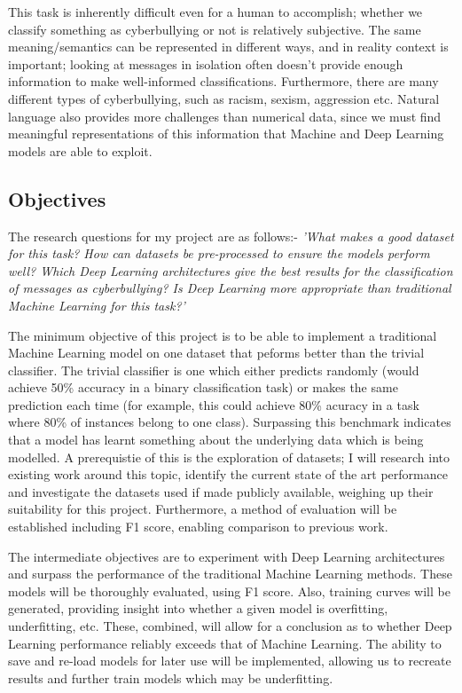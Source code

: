 \documentclass[12pt,a4paper]{article}
\begin{document}
This task is inherently difficult even for a human to accomplish; whether we classify something as cyberbullying or not is relatively subjective. The same meaning/semantics can be represented in different ways, and in reality context is important; looking at messages in isolation often doesn't provide enough information to make well-informed classifications. Furthermore, there are many different types of cyberbullying, such as racism, sexism, aggression etc. Natural language also provides more challenges than numerical data, since we must find meaningful representations of this information that Machine and Deep Learning models are able to exploit.



\subsection{Objectives}
The research questions for my project are as follows:- \newline
\textit{'What makes a good dataset for this task? How can datasets be pre-processed to ensure the models perform well? Which Deep Learning architectures give the best results for the classification of messages as cyberbullying? Is Deep Learning more appropriate than traditional Machine Learning for this task?'} \newline

The minimum objective of this project is to be able to implement a traditional Machine Learning model on one dataset that peforms better than the trivial classifier. The trivial classifier is one which either predicts randomly (would achieve 50\% accuracy in a binary classification task) or makes the same prediction each time (for example, this could achieve 80\% acuracy in a task where 80\% of instances belong to one class). Surpassing this benchmark indicates that a model has learnt something about the underlying data which is being modelled. A prerequistie of this is the exploration of datasets; I will research into existing work around this topic, identify the current state of the art performance and investigate the datasets used if made publicly available, weighing up their suitability for this project. Furthermore, a method of evaluation will be established  including F1 score, enabling comparison to previous work.

The intermediate objectives are to experiment with Deep Learning architectures and surpass the performance of the traditional Machine Learning methods. These models will be thoroughly evaluated, using F1 score. Also, training curves will be generated, providing insight into whether a given model is overfitting, underfitting, etc. These, combined, will allow for a conclusion as to whether Deep Learning performance reliably exceeds that of Machine Learning. The ability to save and re-load models for later use will be implemented, allowing us to recreate results and further train models which may be underfitting.
\end{document}
